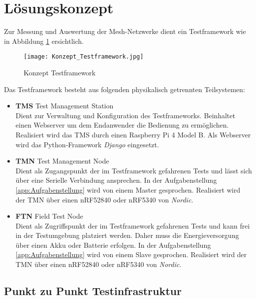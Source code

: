 \clearpage
\section{Lösungskonzept}\label{sec:Loesungskonzept}

Zur Messung und Auswertung der Mesh-Netzwerke dient ein Testframework wie in Abbildung \ref{fig:KonzeptTestframework} ersichtlich.

\begin{figure}[H]
	\centering
	\texttt{[image: Konzept\_Testframework.jpg]}
	\caption{Konzept Testframework}\label{fig:KonzeptTestframework}
\end{figure}


Das Testframework besteht aus folgenden physikalisch getrennten Teilsystemen:

\begin{itemize}
	\item \textbf{TMS} Test Management Station \\ 
	Dient zur Verwaltung und Konfiguration des Testframeworks. Beinhaltet einen Webserver um dem Endanwender die Bedienung zu ermöglichen. Realisiert wird das TMS durch einen Raspberry Pi 4 Model B. Als Webserver wird das Python-Framework \textit{Django} eingesetzt. 
	\item \textbf{TMN} Test Management Node \\ 
	Dient als Zugangspunkt der im Testframework gefahrenen Tests und lässt sich über eine Serielle Verbindung ansprechen. In der Aufgabenstellung \ref{app:Aufgabenstellung} wird von einem Master gesprochen. Realisiert wird der TMN über einen nRF52840 oder nRF5340 von \textit{Nordic}. 
	\item \textbf{FTN} Field Test Node \\ 
	Dient als Zugriffspunkt der im Testframework gefahrenen Tests und kann frei in der Testumgebung platziert werden. Daher muss die Energieversorgung über einen Akku oder Batterie erfolgen. In der Aufgabenstellung  \ref{app:Aufgabenstellung} wird von einem Slave gesprochen. Realisiert wird der TMN über einen nRF52840 oder nRF5340 von \textit{Nordic}.
\end{itemize}



\subsection{Punkt zu Punkt Testinfrastruktur}\label{subsec:PunktzuPunktTestinfrastruktur}


